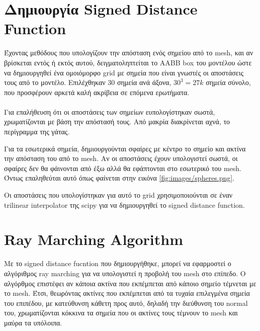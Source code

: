 \documentclass{report}
\begin{document}
\section{Δημιουργία Signed Distance Function}
Έχοντας μεθόδους που υπολογίζουν την απόσταση ενός σημείου από το mesh, και αν βρίσκεται εντός ή εκτός αυτού, δειγματοληπτείται
το AABB box του μοντέλου ώστε να δημιουργηθεί ένα ομοιόμορφο grid με σημεία που είναι γνωστές οι αποστάσεις τους 
από το μοντέλο. Επιλέχθηκαν 30 σημεία ανά άξονα, $30^3 = 27k$ σημεία σύνολο, που προσφέρουν αρκετά καλή ακρίβεια σε
επόμενα ερωτήματα.
\\\\
Για επαλήθευση ότι οι αποστάσεις των σημείων ευπολογίστηκαν σωστά, χρωματίζονται με βάση την απόστασή τους. Από μακρία
διακρίνεται αχνά, το περίγραμμα της γάτας.


Για τα εσωτερικά σημεία, δημιουργούνται σφαίρες με κέντρο το σημείο και ακτίνα την απόσταση του από το mesh. Αν οι αποστάσεις έχουν
υπολογιστεί σωστά, οι σφαίρες δεν θα φάινονται από έξω αλλά θα εφάπτονται στο εσωτερικό του mesh. Όντως επαληθεύται αυτό 
όπως φαίνεται στην εικόνα \ref{fig:images/spheres.png}.


Οι αποστάσεις που υπολογίστηκαν για αυτό το grid χρησιμοποιούνται σε έναν trilinear interpolator της scipy \cite{2020SciPy-NMeth}
για να δημιουργηθεί το signed distance function.

\section{Ray Marching Algorithm}
Με το signed distance fucntion που δημιουργήθηκε, μπορεί να εφαρμοστεί ο αλγόριθμος ray marching για να υπολογιστεί η
προβολή του mesh στο επίπεδο. Ο αλγόρθμος επιστέφει αν κάποια ακτίνα που εκπέμπεται από κάποιο σημείο τέμνεται με το mesh.
Έτσι, θεωρόντας ακτίνες που εκπέμπεται από τα τυχαία επιλεγμένα σημεία του επιπέδου, με κατεύθυνση κάθετη προς αυτό, δηλαδή
την διεύθυνση του normal του, χρωματίζονται κόκκινα τα σημεία που οι ακτίνες τους τέμνουν το mesh και μαύρα τα υπόλοιπα.

\end{document}
